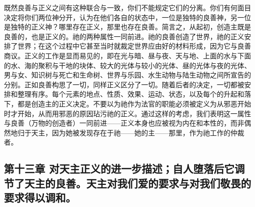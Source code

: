 既然良善与正义之间有这种联合与一致，你们不能规定它们的分离。你们有何面目决定将你们两位神分开，认为在他们各自的状态中，一位是独特的良善神，另一位是独特的正义神？哪里存在正义，那里也存在良善。简言之，从起初，创造主既是良善的，也是正义的。祂的两种属性一同前进。祂的良善创造了世界，祂的正义安排了世界；在这个过程中它甚至当时就裁定世界应由好的材料形成，因为它与良善商议。正义的工作是显而易见的，即在光与暗、昼与夜、天与地、上面的水与下面的水、海的聚积与干地的块体、较大的光体与较小的光体、昼的光体与夜的光体、男与女、知识树与死亡和生命树、世界与乐园、水生动物与陆生动物之间所宣告的分别。正如良善构思了一切，同样正义区分了一切。随着后者的决定，一切都被安排和整理有序。每个元素的地点、性质、效果、运动、状态，以及每个的升起和落下，都是创造主的正义决定。不要以为祂作为法官的职能必须被定义为从邪恶开始时才开始，从而用邪恶的原因玷污祂的正义。通过这样的考虑，我们表明这一属性与良善（万物的创造者）一同前进——正义本身也应被视为内在和本性的，而非偶然地归于天主，因为她被发现存在于祂——她的主——那里，作为祂工作的仲裁者。\par


\subsection{第十三章 对天主正义的进一步描述；自人堕落后它调节了天主的良善。天主对我们爱的要求与对我们敬畏的要求得以调和。}

